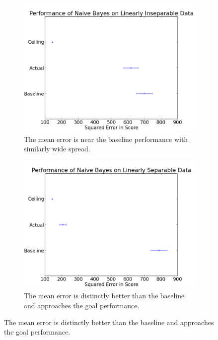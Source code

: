 \documentclass[12pt,notitlepage,twoside]{scrreprt}
\begin{document}
\begin{figure}[h!]
  \begin{subfigure}[b]{0.49\textwidth}
    \centering
 \includegraphics[width=\linewidth]{figs/insep.png}
 \caption{The mean error is near the baseline performance
 with similarly wide spread. \label{insep}}
\end{subfigure}
\begin{subfigure}[b]{0.49\textwidth}
  \centering
  \includegraphics[width=\linewidth]{figs/sep.png}
  \caption{The mean error is distinctly
  better than the baseline and approaches the goal performance. \label{sep}}
\end{subfigure}
\end{figure}
\end{document}
